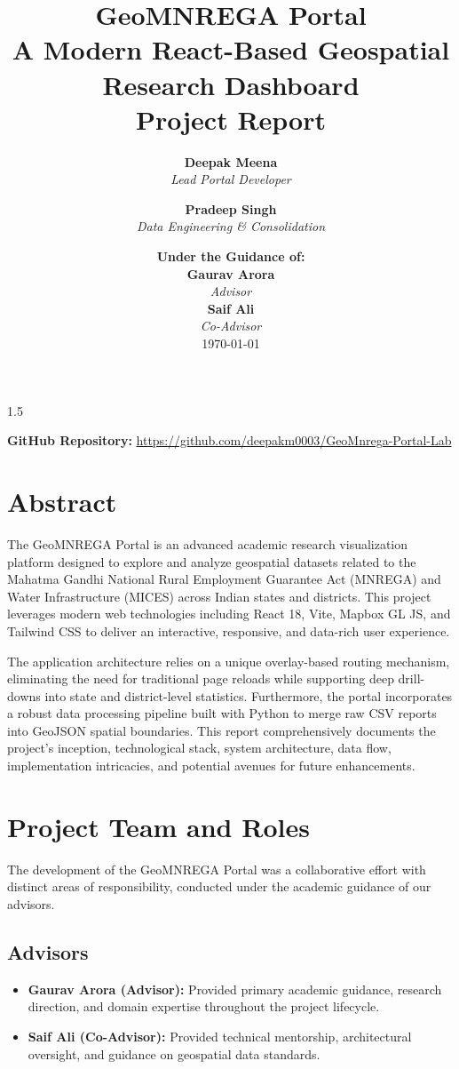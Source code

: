 \documentclass[12pt,a4paper]{report}
\title{
    \vspace{2cm}
    \Huge \textbf{GeoMNREGA Portal}\\
    \Large A Modern React-Based Geospatial Research Dashboard\\
    \vspace{1cm}
    \large Project Report
}
\author{
    \textbf{Deepak Meena} \\ \textit{Lead Portal Developer} \\
    \and
    \textbf{Pradeep Singh} \\ \textit{Data Engineering \& Consolidation}
}
\date{
    \vspace{1cm}
    \textbf{Under the Guidance of:} \\
    \textbf{Gaurav Arora} \\ \textit{Advisor} \\
    \textbf{Saif Ali} \\ \textit{Co-Advisor} \\
    \vspace{1cm}
    \today
}
\begin{document}
\begin{spacing}{1.5}

\maketitle
\thispagestyle{empty}

\begin{center}
    \textbf{GitHub Repository:} \url{https://github.com/deepakm0003/GeoMnrega-Portal-Lab}
\end{center}

\newpage

\chapter*{Abstract}
The GeoMNREGA Portal is an advanced academic research visualization platform designed to explore and analyze geospatial datasets related to the Mahatma Gandhi National Rural Employment Guarantee Act (MNREGA) and Water Infrastructure (MICES) across Indian states and districts. This project leverages modern web technologies including React 18, Vite, Mapbox GL JS, and Tailwind CSS to deliver an interactive, responsive, and data-rich user experience. 

The application architecture relies on a unique overlay-based routing mechanism, eliminating the need for traditional page reloads while supporting deep drill-downs into state and district-level statistics. Furthermore, the portal incorporates a robust data processing pipeline built with Python to merge raw CSV reports into GeoJSON spatial boundaries. This report comprehensively documents the project's inception, technological stack, system architecture, data flow, implementation intricacies, and potential avenues for future enhancements.

\chapter*{Project Team and Roles}
The development of the GeoMNREGA Portal was a collaborative effort with distinct areas of responsibility, conducted under the academic guidance of our advisors.

\section*{Advisors}
\begin{itemize}
    \item \textbf{Gaurav Arora (Advisor):} Provided primary academic guidance, research direction, and domain expertise throughout the project lifecycle.
    \item \textbf{Saif Ali (Co-Advisor):} Provided technical mentorship, architectural oversight, and guidance on geospatial data standards.
\end{itemize}


\end{spacing}
\end{document}
